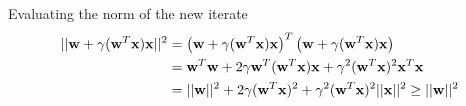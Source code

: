 \documentclass[10pt]{article}
\begin{document}
\begin{enumerate}
Evaluating the norm of the new iterate
\begin{equation}
  \begin{split}
    ||\mathbf{w} + \gamma (\mathbf{w}^T \mathbf{x}) \mathbf{x}||^2
      &= \left(\mathbf{w} + \gamma (\mathbf{w}^T \mathbf{x}) \mathbf{x}\right)^T
         \left(\mathbf{w} + \gamma (\mathbf{w}^T \mathbf{x}) \mathbf{x}\right) \\
      &= \mathbf{w}^T \mathbf{w} + 2 \gamma \mathbf{w}^T (\mathbf{w}^T \mathbf{x}) \mathbf{x} + \gamma^2 (\mathbf{w}^T \mathbf{x})^2 \mathbf{x}^T \mathbf{x} \\
      &= ||\mathbf{w}||^2 + 2 \gamma (\mathbf{w}^T \mathbf{x})^2 + \gamma^2 (\mathbf{w}^T \mathbf{x})^2 ||\mathbf{x}||^2
       \ge ||\mathbf{w}||^2
  \end{split}
\end{equation}



\end{enumerate}
\end{document}
